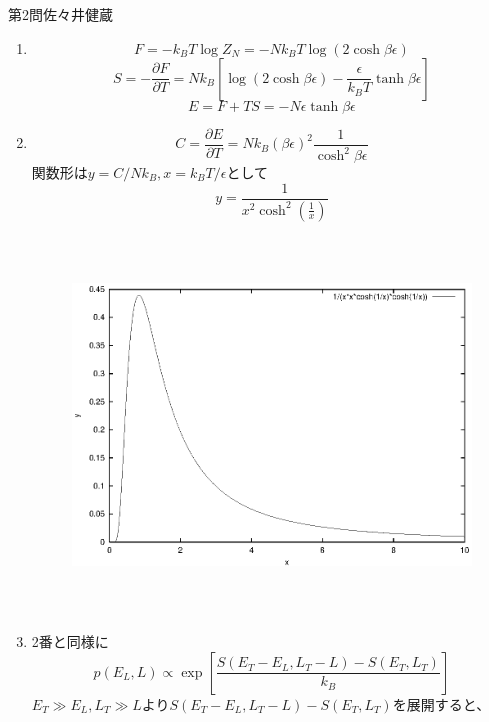 \documentclass[fleqn]{jbook}
\begin{document}
\begin{answer}{第2問}{佐々井健蔵}
\begin{enumerate}
\item 
\begin{equation}
F=-k_BT\log Z_N=-Nk_BT \log (2\cosh \beta \epsilon)
\end{equation}
\begin{equation}
S=-\frac{\partial F}{\partial T}=Nk_B\left[ \log (2\cosh \beta \epsilon)-\frac{\epsilon }{k_BT}\tanh \beta \epsilon \right]
\end{equation}
\begin{equation}
E=F+TS=-N \epsilon \tanh \beta \epsilon
\end{equation}
\item
\begin{equation}
C=\frac{\partial E}{\partial T}=Nk_B(\beta \epsilon)^2 \frac{1} {\cosh ^2\beta \epsilon}
\end{equation}
関数形は$y=C/Nk_B,x=k_BT/\epsilon $として
\begin{equation}
y=\frac{1}{x^2\cosh ^2(\frac{1}{x})}
\end{equation}
\begin{figure}[htbp]
  \begin{center}
    \includegraphics[keepaspectratio=true,height=100mm]{2003phy2-2.eps}
  \end{center}
  \caption{}%
\end{figure}
\item 2番と同様に
\begin{equation}
p(E_L,L) \propto \exp \left[ \frac{S(E_T-E_L,L_T-L)-S(E_T,L_T)}{k_B}\right]
\end{equation}
$E_T\gg E_L,L_T\gg L$より$S(E_T-E_L,L_T-L)-S(E_T,L_T)$を展開すると、

\end{enumerate}
\end{answer}
\end{document}
